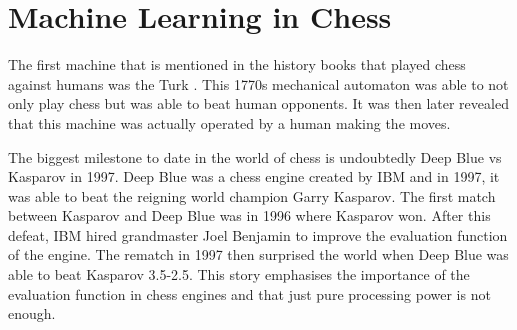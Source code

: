 \section{Machine Learning in Chess}

The first machine that is mentioned in the history books that played chess against humans was the Turk \cite{stephensMechanicalTurkShort2023}. This 1770s mechanical automaton was able to not only play chess but was able to beat human opponents. It was then later revealed that this machine was actually operated by a human making the moves. 

The biggest milestone to date in the world of chess is undoubtedly Deep Blue vs Kasparov in 1997. Deep Blue was a chess engine created by IBM and in 1997, it was able to beat the reigning world champion Garry Kasparov. The first match between Kasparov and Deep Blue was in 1996 where Kasparov won. After this defeat, IBM hired grandmaster Joel Benjamin to improve the evaluation function of the engine. The rematch in 1997 then surprised the world when Deep Blue was able to beat Kasparov 3.5-2.5. This story emphasises the importance of the evaluation function in chess engines and that just pure processing power is not enough. 


